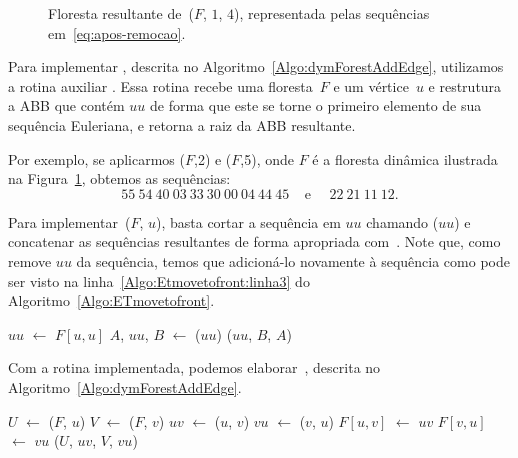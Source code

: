 \begin{figure}[htb]
\centering

\caption{Floresta resultante de~\dymForestDelEdge($F$, $1$, $4$), representada pelas sequências em~\eqref{eq:apos-remocao}.}
\label{fig:algorit-del-pos}
\end{figure}

Para implementar \dymForestAddEdge{}, descrita no Algoritmo~\ref{Algo:dymForestAddEdge}, utilizamos a rotina auxiliar \ETmovetofront{}.
Essa rotina recebe uma floresta~$F$ e um vértice~$u$ e restrutura a ABB que contém $uu$ de forma que este se torne o primeiro elemento de sua sequência Euleriana, e retorna a raiz da ABB resultante. 

Por exemplo, se aplicarmos \ETmovetofront($F$,2) e \ETmovetofront($F$,5), onde $F$ é a floresta dinâmica ilustrada na Figura~\ref{fig:algorit-del-pos}, obtemos as sequências:
\begin{equation}
55~54~40~03~33~30~00~04~44~45~~~~~\text{e}~~~~~~22~21~11~12.\label{eq:apos-moveToFront}
\end{equation}

Para implementar~\ETmovetofront($F$, $u$), basta cortar a sequência em $uu$ chamando \treapSplit($uu$) e concatenar as sequências resultantes de forma apropriada com~\treapJoin{}.
Note que, como \treapSplit{} remove $uu$ da sequência, temos que adicioná-lo novamente à sequência como pode ser visto na linha~\ref{Algo:Etmovetofront:linha3} do Algoritmo~\ref{Algo:ETmovetofront}.

\begin{algorithm}[htb]
\caption{\ETmovetofront($F$, $u$)}
\label{Algo:ETmovetofront}
\begin{algorithmic}[1]
\State $uu$ $\gets$ $F[u,u]$\label{Algo:ETmovetofront:1}
\State $A$, $uu$, $B$ $\gets$ \treapSplit($uu$)\label{Algo:ETmovetofront:2}
\State \Return \treapJoin($uu$, $B$, $A$)\label{Algo:ETmovetofront:linha3}\label{Algo:ETmovetofront:3}
\end{algorithmic}
\end{algorithm}

Com a rotina \ETmovetofront{} implementada, podemos elaborar~\dymForestAddEdge{}, descrita no Algoritmo~\ref{Algo:dymForestAddEdge}.


\begin{algorithm}[htb]
\caption{\dymForestAddEdge($F$, $u$, $v$)}
\label{Algo:dymForestAddEdge}
\begin{algorithmic}[1]
\State $U$ $\gets$ \ETmovetofront($F$, $u$)
\State $V$ $\gets$ \ETmovetofront($F$, $v$)
\State $uv$ $\gets$ \treapCreate($u$, $v$)
\State $vu$ $\gets$ \treapCreate($v$, $u$)
\State $F[u,v]$ $\gets$ $uv$
\State $F[v,u]$ $\gets$ $vu$
\State \treapJoin($U$, $uv$, $V$, $vu$)
\end{algorithmic}
\end{algorithm}


